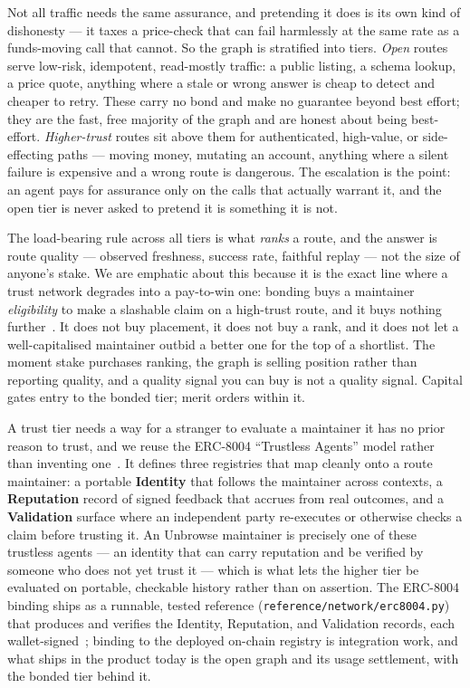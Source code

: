 \documentclass[11pt]{article}
\begin{document}
Not all traffic needs the same assurance, and pretending it does is its own kind of
dishonesty --- it taxes a price-check that can fail harmlessly at the same rate as a
funds-moving call that cannot. So the graph is stratified into tiers. \emph{Open}
routes serve low-risk, idempotent, read-mostly traffic: a public listing, a
schema lookup, a price quote, anything where a stale or wrong answer is cheap to
detect and cheaper to retry. These carry no bond and make no guarantee beyond
best effort; they are the fast, free majority of the graph and are honest about
being best-effort. \emph{Higher-trust} routes sit above them for authenticated,
high-value, or side-effecting paths --- moving money, mutating an account, anything
where a silent failure is expensive and a wrong route is dangerous. The escalation
is the point: an agent pays for assurance only on the calls that actually warrant
it, and the open tier is never asked to pretend it is something it is not.

The load-bearing rule across all tiers is what \emph{ranks} a route, and the answer
is route quality --- observed freshness, success rate, faithful replay --- not the
size of anyone's stake. We are emphatic about this because it is the exact line
where a trust network degrades into a pay-to-win one: bonding buys a maintainer
\emph{eligibility} to make a slashable claim on a high-trust route, and it buys
nothing further~\cite{wedge}. It does not buy placement, it does not buy a
rank, and it does not let a well-capitalised maintainer outbid a better one for the
top of a shortlist. The moment stake purchases ranking, the graph is selling
position rather than reporting quality, and a quality signal you can buy is not a
quality signal. Capital gates entry to the bonded tier; merit orders within it.

A trust tier needs a way for a stranger to evaluate a maintainer it has no prior
reason to trust, and we reuse the ERC-8004 ``Trustless Agents'' model rather than
inventing one~\cite{erc8004}. It defines three registries that map cleanly onto a
route maintainer: a portable \textbf{Identity} that follows the maintainer across
contexts, a \textbf{Reputation} record of signed feedback that accrues from real
outcomes, and a \textbf{Validation} surface where an independent party re-executes
or otherwise checks a claim before trusting it. An Unbrowse maintainer is precisely
one of these trustless agents --- an identity that can carry reputation and be
verified by someone who does not yet trust it --- which is what lets the higher
tier be evaluated on portable, checkable history rather than on assertion. The
ERC-8004 binding ships as a runnable, tested reference
(\texttt{reference/network/erc8004.py}) that produces and verifies the Identity,
Reputation, and Validation records, each wallet-signed~\cite{erc8004}; binding to
the deployed on-chain registry is integration work, and what ships in the product
today is the open graph and its usage settlement, with the bonded tier behind it.
\end{document}
